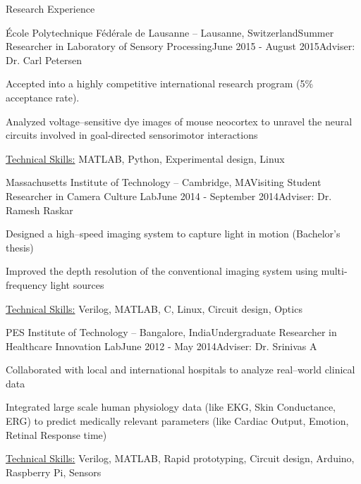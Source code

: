 \documentclass{resume}
\begin{document}
\begin{rSection}{Research Experience}
    \begin{rSubsection}{École Polytechnique Fédérale de Lausanne -- Lausanne, Switzerland}{}{Summer Researcher in Laboratory of Sensory Processing}{June 2015 - August 2015}{Adviser: Dr. Carl Petersen}
\item Accepted into a highly competitive international research program (5\% acceptance rate).
\item Analyzed voltage--sensitive dye images of mouse neocortex to unravel the neural circuits involved in goal-directed sensorimotor interactions
\item \uline{Technical Skills:} MATLAB, Python, Experimental design, Linux
    \end{rSubsection}
    \begin{rSubsection}{Massachusetts Institute of Technology -- Cambridge, MA}{}{Visiting Student Researcher in Camera Culture Lab}{June 2014 - September 2014}{Adviser: Dr. Ramesh Raskar}
\item Designed a high--speed imaging system to capture light in motion (Bachelor's thesis)
\item Improved the depth resolution of  the conventional imaging system using multi-frequency light sources
\item \uline{Technical Skills:} Verilog, MATLAB, C, Linux, Circuit design, Optics
    \end{rSubsection}
  \end{rSection}
 \begin{rSubsection}{PES Institute of Technology -- Bangalore, India}{}{Undergraduate Researcher in Healthcare Innovation Lab}{June 2012 - May 2014}{Adviser: Dr. Srinivas A}
\item Collaborated with local and international hospitals to analyze real--world clinical data
\item Integrated large scale human physiology data (like EKG, Skin Conductance, ERG) to predict medically relevant parameters (like Cardiac Output, Emotion, Retinal Response time)
\item \uline{Technical Skills:} Verilog, MATLAB, Rapid prototyping, Circuit design, Arduino, Raspberry Pi, Sensors
 \end{rSubsection}
\end{document}
